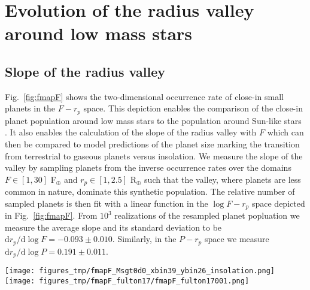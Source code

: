 \documentclass[twocolumn]{emulateapj}
\newcommand{\kepler}[1]{\emph{Kepler}#1}
\newcommand{\ktwo}[1]{\emph{K2}#1}
\begin{document}
\section{Evolution of the radius valley around low mass stars} \label{sect:models}
\subsection{Slope of the radius valley}
Fig.~\ref{fig:fmapF} shows the two-dimensional occurrence rate of
close-in small planets in the $F-r_p$ space. This depiction enables the comparison of the close-in
planet population around low mass stars to the population around Sun-like stars \citep{fulton17}.
It also enables the calculation of the slope of the radius valley with $F$ which can then be compared
to model predictions of the planet size marking the transition from terrestrial to gaseous planets
versus insolation. We measure the slope of the valley by sampling planets from the inverse occurrence
rates over the domains $F\in [1,30]$ F$_{\oplus}$ and $r_p\in [1,2.5]$ R$_{\oplus}$ such that the valley,
where planets are less common in nature, dominate this synthetic population. The relative number of
sampled planets is then fit with a linear function in the $\log{F}-r_p$ space depicted in
Fig.~\ref{fig:fmapF}. From $10^3$ realizations of the resampled planet popluation we
measure the average slope and its standard deviation to be
$\text{d}r_p / \text{d}\log{F} = -0.093\pm 0.010$. Similarly, in the $P-r_p$ space we measure
$\text{d}r_p / \text{d}\log{P} = 0.191\pm 0.011$.


\begin{figure*}
  \centering
  \texttt{[image: figures\_tmp/fmapF\_Msgt0d0\_xbin39\_ybin26\_insolation.png]}
  \texttt{[image: figures\_tmp/fmapF\_fulton17/fmapF\_fulton17001.png]}
  \caption{Planet occurrence rates versus insolation and planetary radius around low mass and Sun-like stars.
    \emph{Right panel}: the maximum a-posteriori occurrence
    rate map calculated from the population of confirmed planets from \kepler{} (\emph{circles}) and
    \ktwo{} (\emph{diamonds}) around low mass dwarf
    stars. Overplotted in black are model predictions of the transition from terrestrial to gaseous
    planets in the following scenarios: core-powered mass loss \citep{gupta19b}, photoevaporation
    \citep{lopez18}, and gas-poor formation \cite{lopez18}. We measure the slope of the radius valley
    to be $\text{d}r_p / \text{d}\log{F} = -0.093\pm 0.010$ which is broadly consistent with predictions
    from gas-poor formation of terrestrial planets.} 
  \label{fig:fmapF}
\end{figure*}
\end{document}
